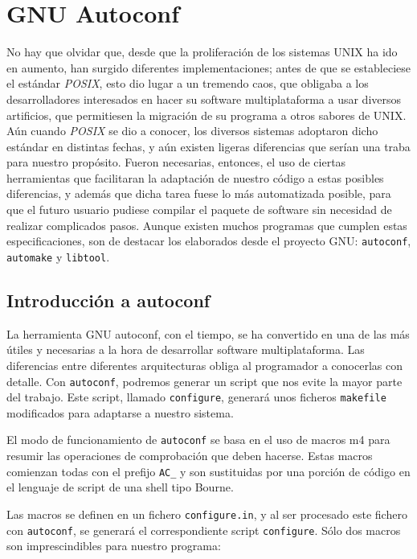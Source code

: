 
\chapter{GNU Autoconf}\label{autoconf}

No hay  que olvidar que,  desde que  la proliferación de  los sistemas
UNIX ha ido en aumento, han surgido diferentes implementaciones; antes
de que  se estableciese el estándar  {\em POSIX}, esto dio  lugar a un
tremendo  caos,  que obligaba  a  los  desarrolladores interesados  en
hacer  su software  multiplataforma  a usar  diversos artificios,  que
permitiesen la migración  de su programa a otros sabores  de UNIX. Aún
cuando {\em POSIX}  se dio a conocer, los  diversos sistemas adoptaron
dicho estándar en distintas fechas,  y aún existen ligeras diferencias
que  serían  una  traba  para nuestro  propósito.  Fueron  necesarias,
entonces, el uso de ciertas herramientas que facilitaran la adaptación
de nuestro  código a  estas posibles diferencias,  y además  que dicha
tarea fuese  lo más automatizada  posible, para que el  futuro usuario
pudiese  compilar el  paquete de  software sin  necesidad de  realizar
complicados pasos.  Aunque existen muchos programas  que cumplen estas
especificaciones,  son de  destacar los  elaborados desde  el proyecto
GNU: {\tt autoconf}, {\tt automake} y {\tt libtool}.

\section{Introducción a autoconf}

La herramienta GNU autoconf, con el tiempo, se ha convertido en una de
las  más  útiles  y  necesarias  a la  hora  de  desarrollar  software
multiplataforma. Las diferencias entre diferentes arquitecturas obliga
al programador a conocerlas con  detalle. Con {\tt autoconf}, podremos
generar  un script  que nos  evite la  mayor parte  del trabajo.  Este
script, llamado {\tt configure}, generará unos ficheros {\tt makefile}
modificados para adaptarse a nuestro sistema.

El  modo de  funcionamiento de  {\tt autoconf}  se basa  en el  uso de
macros  m4 para  resumir  las operaciones  de  comprobación que  deben
hacerse. Estas macros comienzan todas con  el prefijo {\tt AC\_} y son
sustituidas por una porción de código  en el lenguaje de script de una
shell tipo Bourne.

Las  macros  se  definen  en  un  fichero  {\tt  configure.in},  y  al
ser  procesado  este  fichero  con  {\tt  autoconf},  se  generará  el
correspondiente   script  {\tt   configure}.  Sólo   dos  macros   son
imprescindibles para nuestro programa:

